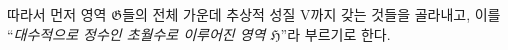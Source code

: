
따라서 먼저 영역 $\mathfrak G$들의 전체 가운데 추상적 성질 V까지 갖는 것들을 골라내고, 이를 ``\emph{대수적으로 정수인 초월수로 이루어진 영역 $\mathfrak H$}''라 부르기로 한다.
